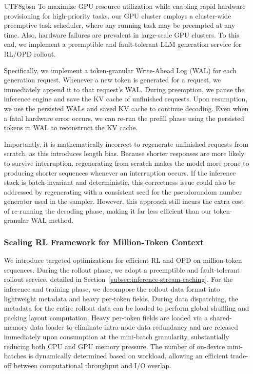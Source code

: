 \documentclass[11pt, a4paper, logo, copyright, nonumbering]{deepseek}
\begin{document}
\begin{CJK*}{UTF8}{gbsn}
To maximize GPU resource utilization while enabling rapid hardware provisioning for high-priority tasks, our GPU cluster employs a cluster-wide preemptive task scheduler, where any running task may be preempted at any time. 
Also, hardware failures are prevalent in large-scale GPU clusters. 
To this end, we implement a preemptible and fault-tolerant LLM generation service for RL/OPD rollout.

Specifically, we implement a token-granular Write-Ahead Log (WAL) for each generation request. 
Whenever a new token is generated for a request, we immediately append it to that request's WAL. 
During preemption, we pause the inference engine and save the KV cache of unfinished requests. 
Upon resumption, we use the persisted WALs and saved KV cache to continue decoding. 
Even when a fatal hardware error occurs, we can re-run the prefill phase using the persisted tokens in WAL to reconstruct the KV cache.

Importantly, it is mathematically incorrect to regenerate unfinished requests from scratch, as this introduces length bias. 
Because shorter responses are more likely to survive interruption, regenerating from scratch makes the model more prone to producing shorter sequences whenever an interruption occurs. 
If the inference stack is batch-invariant and deterministic, this correctness issue could also be addressed by regenerating with a consistent seed for the pseudorandom number generator used in the sampler. 
However, this approach still incurs the extra cost of re-running the decoding phase, making it far less efficient than our token-granular WAL method.

\subsubsection{Scaling RL Framework for Million-Token Context} 
We introduce targeted optimizations for efficient RL and OPD on million-token sequences. 
During the rollout phase, we adopt a preemptible and fault-tolerant rollout service, detailed in Section~\ref{subsec:inference-stream-caching}. 
For the inference and training phase, we decompose the rollout data format into lightweight metadata and heavy per-token fields. 
During data dispatching, the metadata for the entire rollout data can be loaded to perform global shuffling and packing layout computation. 
Heavy per-token fields are loaded via a shared-memory data loader to eliminate intra-node data redundancy and are released immediately upon consumption at the mini-batch granularity, substantially reducing both CPU and GPU memory pressure. 
The number of on-device mini-batches is dynamically determined based on workload, allowing an efficient trade-off between computational throughput and I/O overlap.


\end{CJK*}
\end{document}
